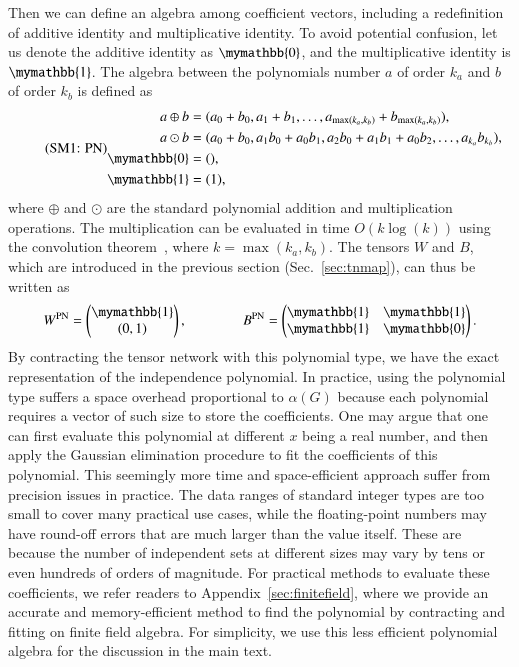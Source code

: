 \documentclass[onefignum, onetabnum]{siamart190516}
\newcommand{\eqname}[1]{\stepcounter{equation}\tag{\theequation : #1}}
\newcommand{\<}{\langle}
\renewcommand{\>}{\rangle}
\newcommand{\App}[1]{Appendix~\ref{#1}}
\begin{document}
Then we can define an algebra among coefficient vectors, including a redefinition of additive identity and multiplicative identity.
To avoid potential confusion, let us denote the additive identity as $\mymathbb{0}$, and the multiplicative identity is $\mymathbb{1}$.
The algebra between the polynomials number $a$ of order $k_a$ and $b$ of order $k_b$ is defined as
\begin{equation}
    \eqname{PN}
    \begin{split}
    a \oplus b &= (a_0 + b_0, a_1 + b_1, \ldots, a_{\max(k_a, k_b)} + b_{\max(k_a, k_b)}),\\
    a \odot b &= (a_0 + b_0, a_1b_0 + a_0b_1, a_{2}b_{0} + a_{1}b_{1} + a_{0}b_{2},  \ldots, a_{k_a} b_{k_b}),\\
    \mymathbb{0} &= (),  \\
    \mymathbb{1} &= (1), \label{eq:polynomial}
    \end{split}
\end{equation}
where $\oplus$ and $\odot$ are the standard polynomial addition and multiplication operations.
The multiplication can be evaluated in time $O(k\log(k))$ using the convolution theorem~\cite{Schonhage1971}, where $k=\max(k_a, k_b)$.
The tensors $W$ and $B$, which are introduced in the previous section (Sec.~\ref{sec:tnmap}), can thus be written as 
\begin{equation}
    W^{\rm PN} = \left(\begin{matrix}
        \mymathbb{1} \\
        (0,1)
    \end{matrix}\right),   
    \qquad \qquad
        B^{\rm PN} = \left(\begin{matrix}
        \mymathbb{1}  & \mymathbb{1} \\
        \mymathbb{1} & \mymathbb{0}
    \end{matrix}\right).
\end{equation}
By contracting the tensor network with this polynomial type, we have the exact representation of the independence polynomial.
In practice, using the polynomial type suffers a space overhead proportional to $\alpha(G)$ because each polynomial requires a vector of such size to store the coefficients. 
One may argue that one can first evaluate this polynomial at different $x$ being a real number,
and then apply the Gaussian elimination procedure to fit the coefficients of this polynomial.
This seemingly more time and space-efficient approach suffer from precision issues in practice.
The data ranges of standard integer types are too small to cover many practical use cases,
while the floating-point numbers may have round-off errors that are much larger than the value itself.
These are because the number of independent sets at different sizes may vary by tens or even hundreds of orders of magnitude.
For practical methods to evaluate these coefficients, we refer readers to \App{sec:finitefield}, where we provide an accurate and memory-efficient method to find the polynomial by contracting and fitting on finite field algebra.
For simplicity, we use this less efficient polynomial algebra for the discussion in the main text.
\end{document}
